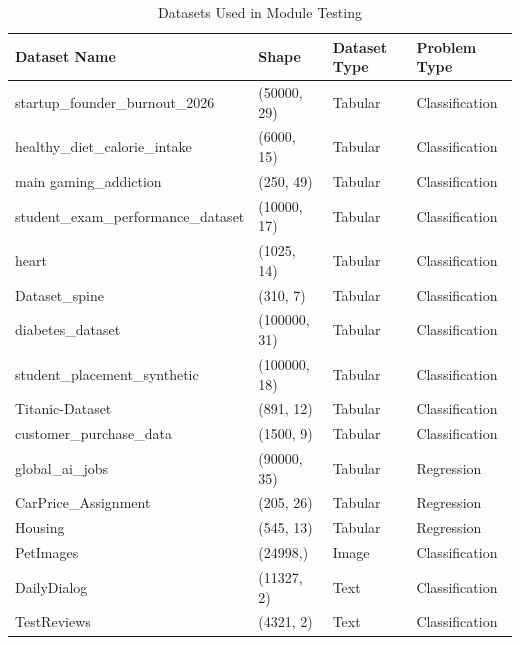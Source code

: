 \documentclass[12pt,a4paper]{report}
\newcommand{\acceleraTableStyle}{%
\small
\renewcommand{\arraystretch}{1.15}
\setlength{\tabcolsep}{4pt}%
}
\begin{document}
\begin{table}[H]
\centering
\acceleraTableStyle
\caption{Datasets Used in Module Testing}
\label{tab:module_testing_datasets}
\small
\renewcommand{\arraystretch}{1.15}
\begin{tabularx}{\textwidth}{@{}
>{\raggedright\arraybackslash}X
>{\centering\arraybackslash}p{}
>{\centering\arraybackslash}p{}
>{\centering\arraybackslash}p{}
@{}}
\hline

\textbf{Dataset Name} & \textbf{Shape} & \textbf{Dataset Type} & \textbf{Problem Type} \\
\midrule
startup\_founder\_burnout\_2026 & (50000, 29) & Tabular & Classification \\
\midrule
healthy\_diet\_calorie\_intake & (6000, 15) & Tabular & Classification \\
\hline
 main
gaming\_addiction & (250, 49) & Tabular & Classification \\
\midrule
student\_exam\_performance\_dataset & (10000, 17) & Tabular & Classification \\
\midrule
heart & (1025, 14) & Tabular & Classification \\
\midrule
Dataset\_spine & (310, 7) & Tabular & Classification \\
\midrule
diabetes\_dataset & (100000, 31) & Tabular & Classification \\
\midrule
student\_placement\_synthetic & (100000, 18) & Tabular & Classification \\
\midrule
Titanic-Dataset & (891, 12) & Tabular & Classification \\
\midrule
customer\_purchase\_data & (1500, 9) & Tabular & Classification \\
\midrule
global\_ai\_jobs & (90000, 35) & Tabular & Regression \\
\midrule
CarPrice\_Assignment & (205, 26) & Tabular & Regression \\
\midrule
Housing & (545, 13) & Tabular & Regression \\
\midrule
PetImages & (24998,) & Image & Classification \\
\midrule
DailyDialog & (11327, 2) & Text & Classification \\
\midrule
TestReviews & (4321, 2) & Text & Classification \\
\hline
\end{tabularx}
\normalsize
\renewcommand{\arraystretch}{1.0}

\end{table}
\end{document}
